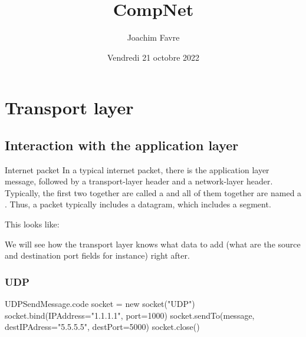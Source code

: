 \documentclass[a4paper]{article}
\title{CompNet}
\author{Joachim Favre}
\date{Vendredi 21 octobre 2022}
\begin{document}
\maketitle


\section{Transport layer}
\subsection{Interaction with the application layer}

\begin{parag}{Internet packet}
    In a typical internet packet, there is the application layer message, followed by a transport-layer header and a network-layer header. Typically, the first two together are called a  and all of them together are named a . Thus, a packet typically includes a datagram, which includes a segment.

    This looks like:

    We will see how the transport layer knows what data to add (what are the source and destination port fields for instance) right after.
\end{parag}

\subsubsection{UDP}
\begin{filecontents*}[overwrite]{UDPSendMessage.code}
socket = new socket("UDP")
socket.bind(IPAddress="1.1.1.1", port=1000)
socket.sendTo(message, destIPAdress="5.5.5.5", destPort=5000)
socket.close()
\end{filecontents*}
\end{document}

